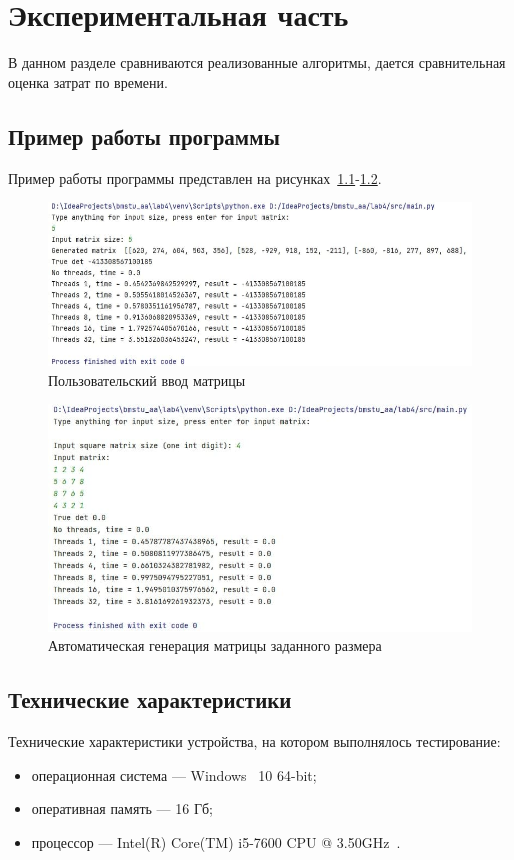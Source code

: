 \documentclass[12pt]{report}
\begin{document}
    \chapter{Экспериментальная часть}
    В данном разделе сравниваются реализованные алгоритмы, дается сравнительная оценка затрат по времени.


    \section{Пример работы программы}
    Пример работы программы представлен на рисунках~\ref{fig:work_1}-\ref{fig:work_2}.
    \captionsetup{singlelinecheck=true}
    \begin{figure}[H]
        \centering
        \includegraphics[width=0.7\linewidth]{img/example_1}
        \caption{Пользовательский ввод матрицы}
        \label{fig:work_1}
    \end{figure}

    \begin{figure}[H]
        \centering
        \includegraphics[width=0.7\linewidth]{img/example_2}
        \caption{Автоматическая генерация матрицы заданного размера}
        \label{fig:work_2}
    \end{figure}


    \section{Технические характеристики}
    Технические характеристики устройства, на котором выполнялось тестирование:
    \begin{itemize}
        \item операционная система --- Windows~\cite{windows} 10 64-bit;
        \item оперативная память --- 16 Гб;
        \item процессор --- Intel(R) Core(TM) i5-7600 CPU @ 3.50GHz~\cite{i5}.
    \end{itemize}
\end{document}

